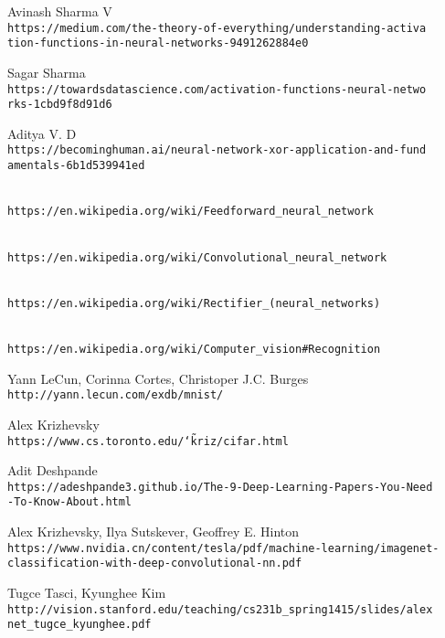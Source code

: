 \begin{thebibliography}{99}
Avinash Sharma V
\\\texttt{https://medium.com/the-theory-of-everything/understanding-activa\\tion-functions-in-neural-networks-9491262884e0}

Sagar Sharma
\\\texttt{https://towardsdatascience.com/activation-functions-neural-netwo\\rks-1cbd9f8d91d6}

Aditya V. D
\\\texttt{https://becominghuman.ai/neural-network-xor-application-and-fund\\amentals-6b1d539941ed}

\\\texttt{https://en.wikipedia.org/wiki/Feedforward\_neural\_network}

\\\texttt{https://en.wikipedia.org/wiki/Convolutional\_neural\_network}

\\\texttt{https://en.wikipedia.org/wiki/Rectifier\_(neural\_networks)}

\\\texttt{https://en.wikipedia.org/wiki/Computer\_vision\#Recognition}

Yann LeCun, Corinna Cortes, Christoper J.C. Burges
\\\texttt{http://yann.lecun.com/exdb/mnist/}

Alex Krizhevsky
\\\texttt{https://www.cs.toronto.edu/\char`\~kriz/cifar.html}

Adit Deshpande
\\\texttt{https://adeshpande3.github.io/The-9-Deep-Learning-Papers-You-Need\\-To-Know-About.html}

Alex Krizhevsky, Ilya Sutskever, Geoffrey E. Hinton
\\\texttt{https://www.nvidia.cn/content/tesla/pdf/machine-learning/imagenet-\\classification-with-deep-convolutional-nn.pdf}

Tugce Tasci, Kyunghee Kim
\\\texttt{http://vision.stanford.edu/teaching/cs231b\_spring1415/slides/alex\\net\_tugce\_kyunghee.pdf}


\end{thebibliography}
